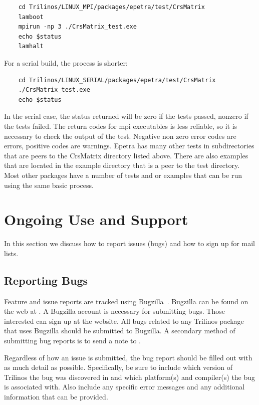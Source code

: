 \documentclass[12pt,relax]{TrilinosUserGuide}
\begin{document}
\begin{verbatim}
	cd Trilinos/LINUX_MPI/packages/epetra/test/CrsMatrix
	lamboot
	mpirun -np 3 ./CrsMatrix_test.exe
	echo $status
	lamhalt
\end{verbatim}

For a serial build, the process is shorter:

\begin{verbatim}
	cd Trilinos/LINUX_SERIAL/packages/epetra/test/CrsMatrix
	./CrsMatrix_test.exe
	echo $status
\end{verbatim}

In the serial case, the status returned will be zero if the tests passed,
nonzero if the tests failed.  The return codes for mpi executables is less
reliable, so it is necessary to check the output of the test.  Negative
non zero error codes are errors, positive codes are warnings.  Epetra has 
many other tests in subdirectories that are peers to the CrsMatrix directory 
listed above.  There are also examples that are located in the example 
directory that is a peer to the test directory.  Most other packages have a 
number of tests and or examples that can be run using the same basic process. 

 
\section{Ongoing Use and Support}
\label{Section:UseSupport}
In this section we discuss how to report issues (bugs) and how to sign up
for mail lists.

\subsection{Reporting Bugs}
\label{subsect:Bugzilla}
Feature and issue reports are tracked using Bugzilla~\cite{Bugzilla}.  
Bugzilla can be found on the web at 
.  
A Bugzilla account is necessary for submitting bugs.  Those interested can 
sign up at the website.  All bugs related to any Trilinos package that uses 
Bugzilla should be submitted to Bugzilla.  A secondary method of submitting
bug reports is to send a note 
to .  

Regardless of how an issue is submitted, the bug report should be filled out 
with as much detail as possible.  Specifically, be sure to include which 
version of Trilinos the bug was discovered in and which 
platform(s) and compiler(s) the bug is associated with.  Also include any 
specific error messages and any additional information that can be provided.
\end{document}
